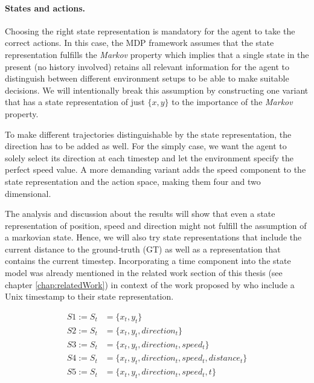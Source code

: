 \paragraph{States and actions.} Choosing the right state representation is mandatory for the agent to take the correct actions. In this case, the MDP framework assumes that the state representation fulfills the \textit{Markov} property which implies that a single state in the present (no history involved) retains all relevant information for the agent to distinguish between different environment setups to be able to make suitable decisions. We will intentionally break this assumption by constructing one variant that has a state representation of just $\{x,y\}$ to the importance of the \textit{Markov} property.
\par
To make different trajectories distinguishable by the state representation, the direction has to be added as well. For the simply case, we want the agent to solely select its direction at each timestep and let the environment specify the perfect speed value. A more demanding variant adds the speed component to the state representation and the action space, making them four and two dimensional.
\par
The analysis and discussion about the results will show that even a state representation of position, speed and direction might not fulfill the assumption of a markovian state. Hence, we will also try state representations that include the current distance to the ground-truth (GT) as well as a representation that contains the current timestep. Incorporating a time component into the state model was already mentioned in the related work section of this thesis (see chapter \ref{chap:relatedWork}) in context of the work proposed by \cite{liu2019vessel} who include a Unix timestamp to their state representation.

\begin{equation}
\begin{aligned}
    S1 := S_t &= \{x_t,y_t\}
\\
    S2 := S_t &= \{x_t,y_t, direction_t\}
\\
    S3 := S_t &= \{x_t,y_t, direction_t, speed_t\}
\\
    S4 := S_t &= \{x_t,y_t, direction_t, speed_t, distance_t\}
\\
    S5 := S_t &= \{x_t,y_t, direction_t, speed_t, t\}
    \end{aligned}
\end{equation}\label{stateRepresentation}

